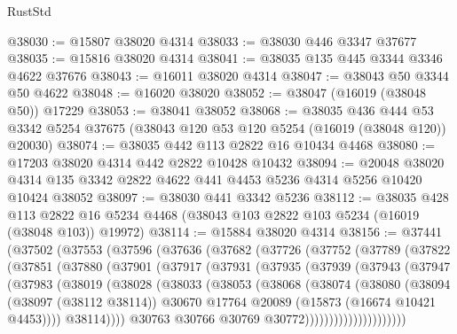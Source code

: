 \begin{lexlean}{RustStd}
\begin{coremodule}
@38030 := @15807 @38020 @4314
@38033 := @38030 @446 @3347 @37677
@38035 := @15816 @38020 @4314
@38041 := @38035 @135 @445 @3344 @3346 @4622 @37676
@38043 := @16011 @38020 @4314
@38047 := @38043 @50 @3344 @50 @4622
@38048 := @16020 @38020
@38052 := @38047 (@16019 (@38048 @50)) @17229
@38053 := @38041 @38052
@38068 := @38035
    @436
    @444
    @53
    @3342
    @5254
    @37675
    (@38043 @120 @53 @120 @5254 (@16019 (@38048 @120)) @20030)
@38074 := @38035 @442 @113 @2822 @16 @10434 @4468
@38080 := @17203 @38020 @4314 @442 @2822 @10428 @10432
@38094 := @20048
    @38020
    @4314
    @135
    @3342
    @2822
    @4622
    @441
    @4453
    @5236
    @4314
    @5256
    @10420
    @10424
    @38052
@38097 := @38030 @441 @3342 @5236
@38112 := @38035
    @428
    @113
    @2822
    @16
    @5234
    @4468
    (@38043 @103 @2822 @103 @5234 (@16019 (@38048 @103)) @19972)
@38114 := @15884 @38020 @4314
@38156 := @37441
    (@37502
      (@37553
        (@37596
          (@37636
            (@37682
              (@37726
                (@37752
                  (@37789
                    (@37822
                      (@37851
                        (@37880
                          (@37901
                            (@37917
                              (@37931
                                (@37935
                                  (@37939
                                    (@37943
                                      (@37947
                                        (@37983
                                          (@38019
                                            (@38028
                                              (@38033
                                                (@38053
                                                  (@38068
                                                    (@38074
                                                      (@38080
                                                        (@38094
                                                          (@38097 (@38112 @38114))
                                                          @30670
                                                          @17764
                                                          @20089
                                                          (@15873 (@16674 @10421 @4453))))
                                                      @38114))))
                                              @30763
                                              @30766
                                              @30769
                                              @30772)))))))))))))))))))))

\end{coremodule}
\end{lexlean}

